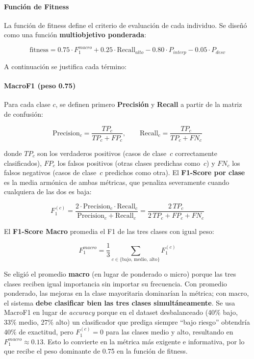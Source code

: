 \documentclass[11pt]{article}
\begin{document}
\paragraph{Función de Fitness}

La funci\'on de fitness define el criterio de evaluaci\'on de cada individuo. Se dise\~n\'o como una funci\'on \textbf{multiobjetivo ponderada}:

\begin{equation}
    \text{fitness} = 0.75 \cdot F_1^{macro} + 0.25 \cdot \text{Recall}_{alto} - 0.80 \cdot P_{interp} - 0.05 \cdot P_{desv}
    \label{eq:fitness}
\end{equation}

A continuaci\'on se justifica cada t\'ermino:

\paragraph{MacroF1 (peso 0.75)}

Para cada clase $c$, se definen primero \textbf{Precisi\'on} y \textbf{Recall} a partir de la matriz de confusi\'on:

\begin{equation}
\text{Precision}_c = \frac{TP_c}{TP_c + FP_c}, \qquad \text{Recall}_c = \frac{TP_c}{TP_c + FN_c}
\end{equation}

donde $TP_c$ son los verdaderos positivos (casos de clase~$c$ correctamente clasificados), $FP_c$ los falsos positivos (otras clases predichas como~$c$) y $FN_c$ los falsos negativos (casos de clase~$c$ predichos como otra). El \textbf{F1-Score por clase} es la media arm\'onica de ambas m\'etricas, que penaliza severamente cuando cualquiera de las dos es baja:

\begin{equation}
F_1^{(c)} = \frac{2 \cdot \text{Precision}_c \cdot \text{Recall}_c}{\text{Precision}_c + \text{Recall}_c} = \frac{2\,TP_c}{2\,TP_c + FP_c + FN_c}
\end{equation}

El \textbf{F1-Score Macro} promedia el F1 de las tres clases con igual peso:

\begin{equation}
F_1^{macro} = \frac{1}{3}\sum_{c \in \{\text{bajo, medio, alto}\}} F_1^{(c)}
\label{eq:macrof1}
\end{equation}

Se eligió el promedio \textbf{macro} (en lugar de ponderado o micro) porque las tres clases reciben igual importancia sin importar su frecuencia. Con promedio ponderado, las mejoras en la clase mayoritaria dominar\'ian la m\'etrica; con macro, el sistema \textbf{debe clasificar bien las tres clases simult\'aneamente}. Se usa MacroF1 en lugar de \textit{accuracy} porque en el dataset desbalanceado (40\% bajo, 33\% medio, 27\% alto) un clasificador que prediga siempre ``bajo riesgo'' obtendr\'ia 40\% de exactitud, pero $F_1^{(c)} = 0$ para las clases medio y alto, resultando en $F_1^{macro} \approx 0.13$. Esto lo convierte en la m\'etrica m\'as exigente e informativa, por lo que recibe el peso dominante de 0.75 en la funci\'on de fitness.
\end{document}
